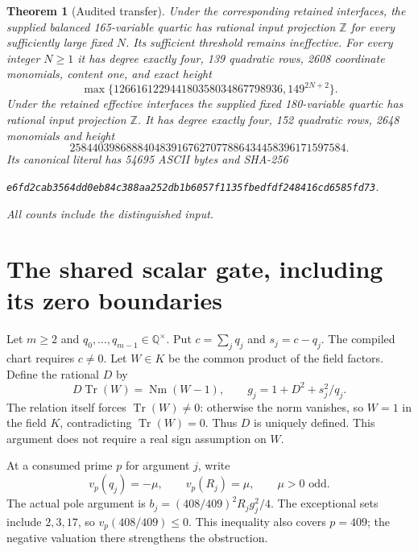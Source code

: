 \documentclass[11pt]{article}
\newtheorem{theorem}{Theorem}
\theoremstyle{remark}\newtheorem{remark}[theorem]{Remark}
\newcommand{\Q}{\mathbb Q}\newcommand{\Z}{\mathbb Z}
\newcommand{\Tr}{\operatorname{Tr}}\newcommand{\Nm}{\operatorname{Nm}}
\begin{document}
\begin{theorem}[Audited transfer]
Under the corresponding retained interfaces, the supplied balanced
165-variable quartic has rational input projection $\Z$ for every
sufficiently large fixed $N$. Its sufficient threshold remains
ineffective. For every integer $N\ge1$ it has degree exactly four,
139 quadratic rows, 2608 coordinate monomials, content one, and exact
height
\[
 \max\{126616122944180358034867798936,149^{2N+2}\}.
\]
Under the retained effective interfaces the supplied fixed
180-variable quartic has rational input projection $\Z$. It has degree
exactly four, 152 quadratic rows, 2648 monomials and height
\[
2584403986888404839167627077886434458396171597584.
\]
Its canonical literal has 54695 ASCII bytes and SHA-256
\begin{center}\small
\texttt{e6fd2cab3564dd0eb84c388aa252db1b6057f1135fbedfdf248416cd6585fd73}.
\end{center}
All counts include the distinguished input.
\end{theorem}

\section{The shared scalar gate, including its zero boundaries}
Let $m\ge2$ and $q_0,\ldots,q_{m-1}\in\Q^\times$. Put
$c=\sum_jq_j$ and $s_j=c-q_j$. The compiled chart requires $c\ne0$.
Let $W\in K$ be the common product of the field factors. Define the
rational $D$ by
\begin{equation}\label{eq:gate}
 D\Tr(W)=\Nm(W-1),\qquad
 g_j=1+D^2+s_j^2/q_j.
\end{equation}
The relation itself forces $\Tr(W)\ne0$: otherwise the norm vanishes,
so $W=1$ in the field $K$, contradicting $\Tr(W)=0$. Thus $D$ is
uniquely defined. This argument does not require a real sign
assumption on $W$.

At a consumed prime $p$ for argument $j$, write
\[
 v_p(q_j)=-\mu,\qquad v_p(R_j)=\mu,\qquad \mu>0\text{ odd}.
\]
The actual pole argument is
$b_j=(408/409)^2R_jg_j^2/4$.
The exceptional sets include $2,3,17$, so
$v_p(408/409)\le0$. This inequality also covers $p=409$;
the negative valuation there strengthens the obstruction.
\end{document}
